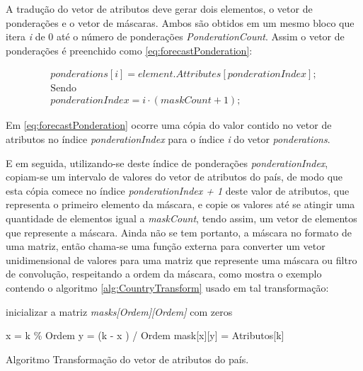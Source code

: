 A tradução do vetor de atributos deve gerar dois elementos, o vetor de ponderações e o vetor de máscaras. Ambos são obtidos em um mesmo bloco que itera \emph{i} de 0 até o número de ponderações \emph{PonderationCount}. Assim o vetor de ponderações é preenchido como \ref{eq:forecastPonderation}:
	
\begin{equation}
\label{eq:forecastPonderation}
\begin{split}
ponderations[i] = element.Attributes[ponderationIndex];\\
\text{Sendo}\\
ponderationIndex = i \cdot (maskCount + 1);
\end{split}
\end{equation}


Em \ref{eq:forecastPonderation} ocorre uma cópia do valor contido no vetor de atributos no índice \emph{ponderationIndex} para o índice \emph{i} do vetor \emph{ponderations}.

E em seguida, utilizando-se deste índice de ponderações \emph{ponderationIndex}, copiam-se um intervalo de valores do vetor de atributos do país, de modo que esta cópia comece no índice \emph{ponderationIndex + 1} deste valor de atributos, que representa o primeiro elemento da máscara, e copie os valores até se atingir uma quantidade de elementos igual a \emph{maskCount}, tendo assim, um vetor de elementos que represente a máscara. Ainda não se tem portanto, a máscara no formato de uma matriz, então chama-se uma função externa para converter um vetor unidimensional de valores para uma matriz que represente uma máscara ou filtro de convolução, respeitando a ordem da máscara, como mostra o exemplo contendo o algoritmo \ref{alg:CountryTransform} usado em tal transformação:

\vspace{10px}
\begin{algorithm}[h]
\SetAlgoLined
{}
inicializar a matriz \emph{masks[Ordem][Ordem]} com zeros\;

{
x = k \% Ordem\;
y = (k - x ) / Ordem\;
mask[x][y] = Atributos[k]\; 
}
\caption{ Algoritmo Transformação do vetor de atributos do país.}
\label{alg:CountryTransform}
\end{algorithm}

